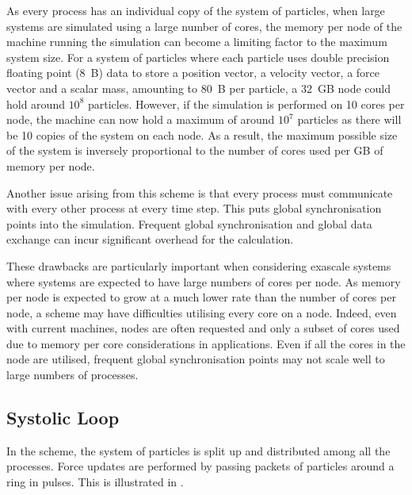 As every process has an individual copy of the system of particles,
when large systems are simulated using a large number of cores,
the memory per node of the machine running the simulation
can become a limiting factor to the maximum system size.
%
For a system of particles where each particle uses double
precision floating point (8~B) data to store
a position vector,
a velocity vector,
a force vector and
a scalar mass,
amounting to 80~B per particle, a 32~GB node could hold around $10^8$
particles.
%
However, if the simulation is performed on 10 cores per node,
the machine can now hold a maximum of around $10^7$ particles
as there will be 10 copies of the system on each node.
%
As a result, the maximum possible size of the system is
inversely proportional to
the number of cores used per GB of memory per node.

Another issue arising from this scheme is
that every process must communicate with
every other process at every time step.
%
This puts global synchronisation points into the simulation.
%
Frequent global synchronisation and global data exchange can incur
significant overhead for the calculation.

%
These drawbacks are particularly important when considering exascale systems
where systems are expected to have large numbers of cores per node.
%
As memory per node is expected to grow at a much lower rate than
the number of cores per node,
a \replicateddata{} scheme may have difficulties
utilising every core on a node.
%
Indeed, even with current machines, nodes are often requested and only a
subset of cores used due to memory per core considerations in applications.
%
Even if all the cores in the node are utilised, frequent global synchronisation
points may not scale well to large numbers of processes.



\subsection{Systolic Loop}
\label{sec:background:subsec:systolic_loop}

%
In the \systolicloop{} scheme, the system of particles is
split up and distributed among all the processes.
%
Force updates are performed by
passing packets of particles around a ring in pulses.
%
This is illustrated in .


